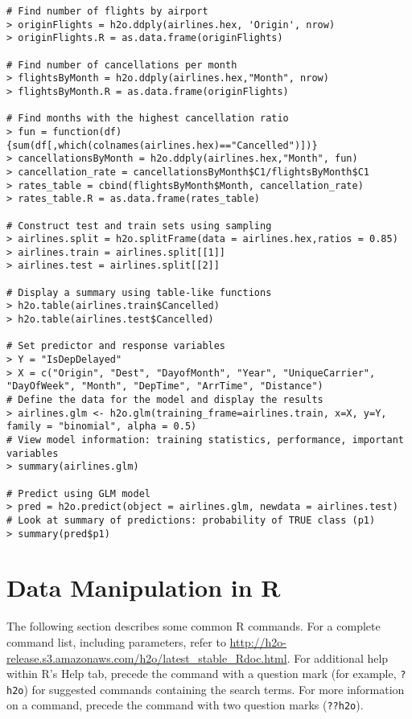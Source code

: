 {{\begin{lstlisting}[style=R]
# Find number of flights by airport
> originFlights = h2o.ddply(airlines.hex, 'Origin', nrow)
> originFlights.R = as.data.frame(originFlights)

# Find number of cancellations per month
> flightsByMonth = h2o.ddply(airlines.hex,"Month", nrow)
> flightsByMonth.R = as.data.frame(originFlights)

# Find months with the highest cancellation ratio
> fun = function(df) {sum(df[,which(colnames(airlines.hex)=="Cancelled")])}
> cancellationsByMonth = h2o.ddply(airlines.hex,"Month", fun)
> cancellation_rate = cancellationsByMonth$C1/flightsByMonth$C1
> rates_table = cbind(flightsByMonth$Month, cancellation_rate)
> rates_table.R = as.data.frame(rates_table)

# Construct test and train sets using sampling
> airlines.split = h2o.splitFrame(data = airlines.hex,ratios = 0.85)
> airlines.train = airlines.split[[1]]
> airlines.test = airlines.split[[2]]

# Display a summary using table-like functions
> h2o.table(airlines.train$Cancelled)
> h2o.table(airlines.test$Cancelled)

# Set predictor and response variables
> Y = "IsDepDelayed"
> X = c("Origin", "Dest", "DayofMonth", "Year", "UniqueCarrier", "DayOfWeek", "Month", "DepTime", "ArrTime", "Distance")
# Define the data for the model and display the results
> airlines.glm <- h2o.glm(training_frame=airlines.train, x=X, y=Y, family = "binomial", alpha = 0.5)
# View model information: training statistics, performance, important variables
> summary(airlines.glm)

# Predict using GLM model
> pred = h2o.predict(object = airlines.glm, newdata = airlines.test)
# Look at summary of predictions: probability of TRUE class (p1)
> summary(pred$p1)

\end{lstlisting}
\newpage
\section{Data Manipulation in R}

The following section describes some common R commands. For a complete command list, including parameters, refer to {\url{http://h2o-release.s3.amazonaws.com/h2o/latest_stable_Rdoc.html}}.
For additional help within R's Help tab, precede the command with a question mark (for example, {\texttt{?h2o}}) for suggested commands containing the search terms. For more information on a command, precede the command with two question marks ({\texttt{??h2o}}). 

}}
